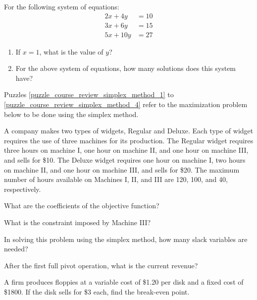 \begin{puzzle}
    For the following system of equations:
    \begin{align*}
        2x + 4y  & = 10 \\
        3x + 6y  & = 15 \\
        5x + 10y & = 27
    \end{align*}
    \begin{enumerate}
        \item If \(x = 1\), what is the value of \(y\)?
        \item For the above system of equations, how many solutions does this system have?
    \end{enumerate}

\end{puzzle}


Puzzles \ref{puzzle_course_review_simplex_method_1} to \ref{puzzle_course_review_simplex_method_4} refer to the maximization problem below to be done using the simplex method.

A company makes two types of widgets, Regular and Deluxe. Each type of widget requires the use of three machines for its production. The Regular widget requires three hours on machine I, one hour on machine II, and one hour on machine III, and sells for \$10. The Deluxe widget requires one hour on machine I, two hours on machine II, and one hour on machine III, and sells for \$20. The maximum number of hours available on Machines I, II, and III are 120, 100, and 40, respectively.


\begin{puzzle}\label{puzzle_course_review_simplex_method_1}
    What are the coefficients of the objective function?
\end{puzzle}

\begin{puzzle}
    What is the constraint imposed by Machine III?
\end{puzzle}

\begin{puzzle}
    In solving this problem using the simplex method, how many slack variables are needed?
\end{puzzle}

\begin{puzzle}\label{puzzle_course_review_simplex_method_4}
    After the first full pivot operation, what is the current revenue?
\end{puzzle}

\begin{puzzle}
    A firm produces floppies at a variable cost of \$1.20 per disk and a fixed cost of \$1800. If the disk sells for \$3 each, find the break-even point.
\end{puzzle}


